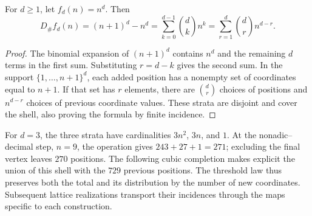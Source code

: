 \begin{proposition}
For \(d\geq1\), let \(f_d(n)=n^d\). Then
\begin{equation}
 D_\#f_d(n)=(n+1)^d-n^d
 =\sum_{k=0}^{d-1}\binom dk n^k
 =\sum_{r=1}^{d}\binom dr n^{d-r}.
 \label{vi:cube:mg07:binomial}
\end{equation}
\end{proposition}

\begin{proof}
The binomial expansion of \((n+1)^d\) contains \(n^d\) and the
remaining \(d\) terms in the first sum. Substituting \(r=d-k\)
gives the second sum. In the support \(\{1,\ldots,n+1\}^d\),
each added position has a nonempty set of coordinates equal to
\(n+1\). If that set has \(r\) elements, there are \(\binom dr\)
choices of positions and \(n^{d-r}\) choices of previous coordinate
values. These strata are disjoint and cover the shell, also proving
the formula by finite incidence.
\end{proof}

For \(d=3\), the three strata have cardinalities \(3n^2\),
\(3n\), and \(1\). At the nonadic--decimal step, \(n=9\), the
operation gives \(243+27+1=271\); excluding the final vertex leaves
\(270\) positions. The following cubic completion makes explicit
the union of this shell with the \(729\) previous positions. The
threshold law thus preserves both the total and its distribution by
the number of new coordinates. Subsequent lattice realizations
transport their incidences through the maps specific to each
construction.
